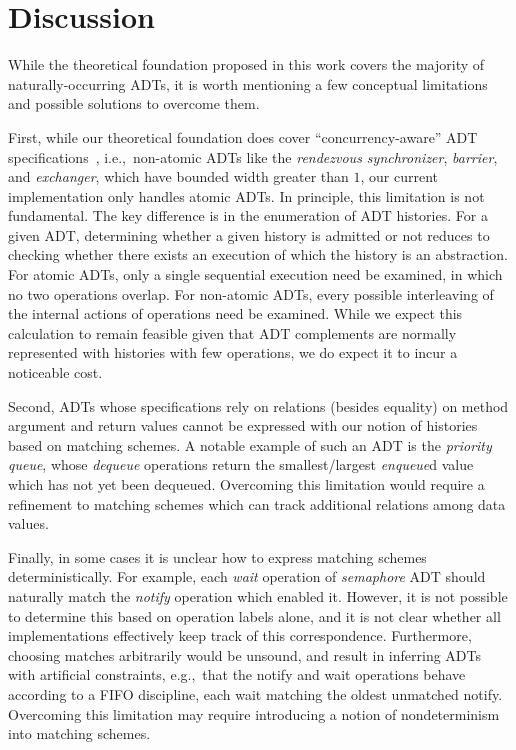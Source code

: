 \section{Discussion}
\label{sec:discussion}

While the theoretical foundation proposed in this work covers the majority of
naturally-occurring ADTs, it is worth mentioning a few conceptual limitations
and possible solutions to overcome them.

First, while our theoretical foundation does cover “concurrency-aware” ADT
specifications~\cite{conf/podc/HemedR14}, i.e.,~non-atomic ADTs like the
\emph{rendezvous synchronizer}, \emph{barrier}, and \emph{exchanger}, which
have bounded width greater than $1$, our current implementation only
handles atomic ADTs. In principle, this limitation is not fundamental. The key
difference is in the enumeration of ADT histories. For a given ADT,
determining whether a given history is admitted or not reduces
to checking whether there exists an execution of which the history is an
abstraction. For atomic ADTs, only a single sequential execution need be
examined, in which no two operations overlap. For non-atomic ADTs, every
possible interleaving of the internal actions of operations need be examined.
While we expect this calculation to remain feasible given that ADT complements
are normally represented with histories with few operations, we do expect it to
incur a noticeable cost.

Second, ADTs whose specifications rely on relations (besides equality) on
method argument and return values cannot be expressed with our notion of
histories based on matching schemes. A notable example of such an ADT is the
\emph{priority queue}, whose \emph{dequeue} operations return the
smallest/largest \emph{enqueue}d value which has not yet been dequeued.
Overcoming this limitation would
require a refinement to matching schemes which can track additional relations
among data values.

Finally, in some cases it is unclear how to express matching schemes
deterministically. For example, each \emph{wait} operation of \emph{semaphore}
ADT should naturally match the \emph{notify} operation which enabled it.
However, it is not possible to determine this based on operation labels alone,
and it is not clear whether all implementations effectively keep track of this
correspondence. Furthermore, choosing matches arbitrarily would be unsound, and
result in inferring ADTs with artificial constraints, e.g.,~that the notify and
wait operations behave according to a FIFO discipline, each wait matching the
oldest unmatched notify. Overcoming this limitation may require introducing a
notion of nondeterminism into matching schemes.
